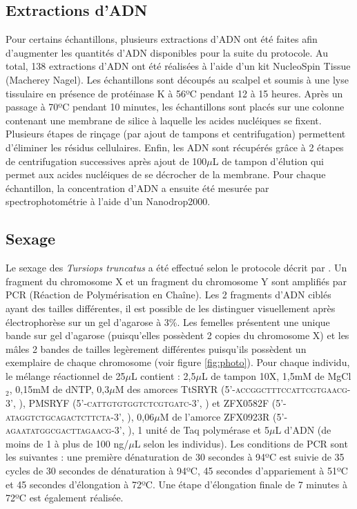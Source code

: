 \documentclass[a4paper,12pt,twoside]{article}\usepackage[]{graphicx}\usepackage[]{color}
\begin{document}
\subsection{Extractions d'ADN}
Pour certains échantillons, plusieurs extractions d'ADN ont été faites afin d'augmenter les quantités d'ADN disponibles pour la suite du protocole. Au total, 138 extractions d'ADN ont été réalisées à l'aide d'un kit NucleoSpin\textregistered{} Tissue (Macherey Nagel). Les échantillons sont découpés au scalpel et soumis à une lyse tissulaire en présence de protéinase K à 56ºC pendant 12 à 15 heures. Après un passage à 70ºC pendant 10 minutes, les échantillons sont placés sur une colonne contenant une membrane de silice à laquelle les acides nucléiques se fixent. Plusieurs étapes de rinçage (par ajout de tampons et centrifugation) permettent d'éliminer les résidus cellulaires. Enfin, les ADN sont récupérés grâce à 2 étapes de centrifugation successives après ajout de 100$\mu$L de tampon d'élution qui permet aux acides nucléiques de se décrocher de la membrane. Pour chaque échantillon, la concentration d'ADN a ensuite été mesurée par spectrophotométrie à l'aide d'un Nanodrop2000.

\subsection{Sexage}
Le sexage des \emph{Tursiops truncatus} a été effectué selon le protocole décrit par \citet{rosel2003pcr}. Un fragment du chromosome X et un fragment du chromosome Y sont amplifiés par PCR (Réaction de Polymérisation en Chaîne). Les 2 fragments d'ADN ciblés ayant des tailles différentes, il est possible de les distinguer visuellement après électrophorèse sur un gel d'agarose à 3\%. Les femelles présentent une unique bande sur gel d'agarose (puisqu'elles possèdent 2 copies du chromosome X) et les mâles 2 bandes de tailles legèrement différentes puisqu'ils possèdent un exemplaire de chaque chromosome (voir figure \ref{fig:photo}).
Pour chaque individu, le mélange réactionnel de 25$\mu$L contient : 2,5$\mu$L de tampon 10X, 1,5mM de MgCl$_2$, 0,15mM de dNTP, 0,3$\mu$M des amorces TtSRYR (5'-\textsc{accggctttccattcgtgaacg}-3', \citealt{rosel2003pcr}), PMSRYF (5'-\textsc{cattgtgtggtctcgtgatc}-3', \citealt{richard1994dna}) et ZFX0582F (5'-\textsc{ataggtctgcagactcttcta}-3', \citealt{berube1996identification}), 0,06$\mu$M de l'amorce ZFX0923R (5'-\textsc{agaatatggcgacttagaacg}-3', \citealt{berube1996identification}), 1 unité de Taq polymérase et 5$\mu$L d'ADN (de moins de 1 à plus de 100 ng/$\mu$L selon les individus). Les conditions de PCR sont les suivantes : une première dénaturation de 30 secondes à 94ºC est suivie de 35 cycles de 30 secondes de dénaturation à 94ºC, 45 secondes d'appariement à 51ºC et 45 secondes d'élongation à 72ºC. Une étape d'élongation finale de 7 minutes à 72ºC est également réalisée.
\end{document}
